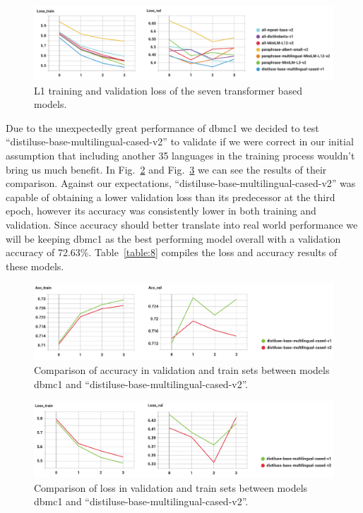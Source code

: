 \begin{figure}[!ht]
\centerline{\includegraphics[width=1.1\textwidth]{figuras/7embeddings_transformer_-Loss.png}   }
\caption{L1 training and validation loss of the seven transformer based models. }
\label{7loss}
\end{figure}

Due to the unexpectedly great performance of dbmc1 we decided to test ``distiluse-base-multilingual-cased-v2'' to validate if we were correct in our initial assumption that including another 35 languages in the training process wouldn't  bring us much benefit. In Fig.~\ref{multilingual_acc} and Fig.~\ref{multilingual_loss} we can see the results of their comparison.
Against our expectations, ``distiluse-base-multilingual-cased-v2'' was capable of obtaining a lower validation  loss than its predecessor at the third epoch, however its accuracy was consistently lower in both training and validation. Since accuracy should better translate into real world performance we will be keeping dbmc1 as the best performing model overall with a validation accuracy of 72.63\%. Table~\ref{table:8} compiles the loss and accuracy results of these models.

\begin{figure}[!ht]
\centerline{\includegraphics[width=1.1\textwidth]{figuras/multilingual_1vs2_-Acc.png}   }
\caption{Comparison of accuracy in validation and train sets between models dbmc1 and ``distiluse-base-multilingual-cased-v2''.}
\label{multilingual_acc}
\end{figure}


\begin{figure}[!ht]
\centerline{\includegraphics[width=1.1\textwidth]{figuras/multilingual_1vs2_-Loss.png}   }
\caption{Comparison of loss in validation and train sets between models dbmc1 and ``distiluse-base-multilingual-cased-v2''.}
\label{multilingual_loss}
\end{figure}


